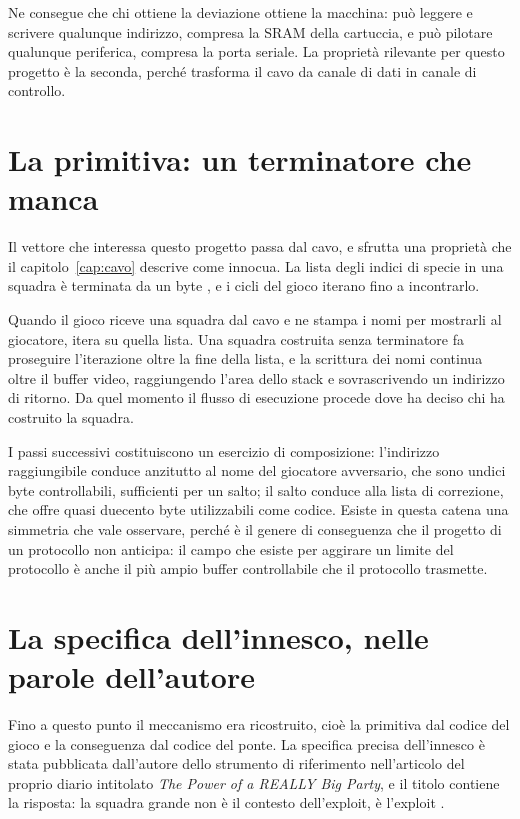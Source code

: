 Ne consegue che chi ottiene la deviazione ottiene la macchina: può leggere e scrivere qualunque indirizzo, compresa la SRAM della cartuccia, e può pilotare qualunque periferica, compresa la porta seriale. La proprietà rilevante per questo progetto è la seconda, perché trasforma il cavo da canale di dati in canale di controllo.

\section{La primitiva: un terminatore che manca}

Il vettore che interessa questo progetto passa dal cavo, e sfrutta una proprietà che il capitolo~\ref{cap:cavo} descrive come innocua. La lista degli indici di specie in una squadra è terminata da un byte , e i cicli del gioco iterano fino a incontrarlo.

Quando il gioco riceve una squadra dal cavo e ne stampa i nomi per mostrarli al giocatore, itera su quella lista. Una squadra costruita senza terminatore fa proseguire l'iterazione oltre la fine della lista, e la scrittura dei nomi continua oltre il buffer video, raggiungendo l'area dello stack e sovrascrivendo un indirizzo di ritorno. Da quel momento il flusso di esecuzione procede dove ha deciso chi ha costruito la squadra.

I passi successivi costituiscono un esercizio di composizione: l'indirizzo raggiungibile conduce anzitutto al nome del giocatore avversario, che sono undici byte controllabili, sufficienti per un salto; il salto conduce alla lista di correzione, che offre quasi duecento byte utilizzabili come codice. Esiste in questa catena una simmetria che vale osservare, perché è il genere di conseguenza che il progetto di un protocollo non anticipa: il campo che esiste per aggirare un limite del protocollo è anche il più ampio buffer controllabile che il protocollo trasmette.

\section{La specifica dell'innesco, nelle parole dell'autore}

Fino a questo punto il meccanismo era ricostruito, cioè la primitiva dal codice del gioco e la conseguenza dal codice del ponte. La specifica precisa dell'innesco è stata pubblicata dall'autore dello strumento di riferimento nell'articolo del proprio diario intitolato \emph{The Power of a REALLY Big Party}, e il titolo contiene la risposta: la squadra grande non è il contesto dell'exploit, è l'exploit \cite{devlog-ptgb}.

